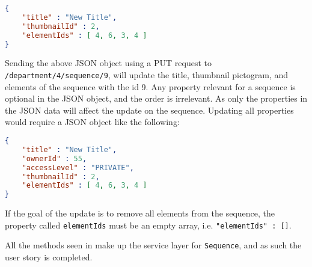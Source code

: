 \begin{lstlisting}[language=json]
{
	"title" : "New Title",
	"thumbnailId" : 2,
	"elementIds" : [ 4, 6, 3, 4 ]
}
\end{lstlisting}

Sending the above JSON object using a PUT request to \texttt{/department/4/sequence/9}, will update the title, thumbnail pictogram, and elements of the sequence with the id 9.
Any property relevant for a sequence is optional in the JSON object, and the order is irrelevant.
As only the properties in the JSON data will affect the update on the sequence.
Updating all properties would require a JSON object like the following:

\begin{lstlisting}[language=json]
{
	"title" : "New Title",
	"ownerId" : 55,
	"accessLevel" : "PRIVATE",
	"thumbnailId" : 2,
	"elementIds" : [ 4, 6, 3, 4 ]
}
\end{lstlisting}

If the goal of the update is to remove all elements from the sequence, the property called \texttt{elementIds} must be an empty array, i.e. \texttt{"elementIds" : []}.

\bigskip

All the methods seen in  make up the service layer for \texttt{Sequence}, and as such the user story is completed.
